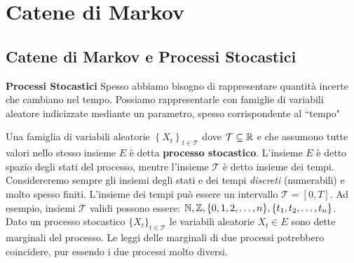 \chapter{Catene di Markov}

\section{Catene di Markov e Processi Stocastici}

\begin{defn}
	\textbf{Processi Stocastici}
	Spesso abbiamo bisogno di rappresentare quantit\`a incerte che cambiano nel tempo. Possiamo rappresentarle con famiglie di variabili aleatore indicizzate mediante un parametro, spesso corrispondente al ``tempo"

	Una famiglia di variabili aleatorie $ \left\{X_t\right\}_{t\in \mathcal{T}} $ dove $ \mathcal{T} \subseteq \mathbb{R} $ e che assumono tutte valori nello stesso insieme $ E $ \`e  detta \textbf{processo stocastico}. L'insieme $ E $ \`e  detto spazio degli stati del processo, mentre l'insieme $ \mathcal{T} $ \`e  detto insieme dei tempi. Considereremo sempre gli insiemi degli stati e dei tempi \textit{discreti} (numerabili) e molto spesso finiti. L'insieme dei tempi pu\`o  essere un intervallo $ \mathcal{T} = [0,T] $. Ad esempio, insiemi $ \mathcal{T} $ validi possono essere: $ \mathbb{N}, \mathbb{Z}, \{0, 1, 2, \hdots, n\}, \{t_1, t_2, \hdots, t_n\} $. Dato un processo stocastico $ \{X_t\}_{t \in \mathcal{T}} $ le variabili aleatorie $ X_t \in E $ sono dette marginali del processo. Le leggi delle marginali di due processi potrebbero coincidere, pur essendo i due processi molto diversi.

\end{defn}


